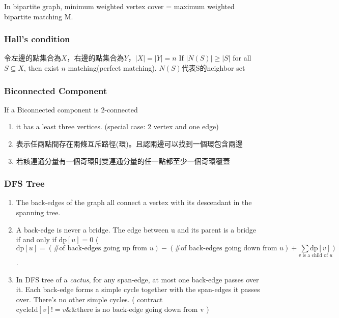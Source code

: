 In bipartite graph, minimum weighted vertex cover = maximum weighted bipartite matching M.

\subsubsection{Hall's condition}

令左邊的點集合為$X$，右邊的點集合為$Y$，$|X| = |Y| = n$
If $|N(S)| \geq |S|$ for all $S \subseteq X$, then exist $n$ matching(perfect matching).
$N(S)$代表S的neighbor set


\subsubsection{Biconnected Component}
If a Biconnected component is 2-connected
\begin{enumerate}
	\setlength\itemsep{-0.5em}
	\item it has a least three vertices. (special case: 2 vertex and one edge)
	\item 表示任兩點間存在兩條互斥路徑(環)。且認兩邊可以找到一個環包含兩邊
	\item 若該連通分量有一個奇環則雙連通分量的任一點都至少一個奇環覆蓋
\end{enumerate}
\subsubsection{DFS Tree}
\begin{enumerate}
	\setlength\itemsep{-0.5em}
	\item The back-edges of the graph all connect a vertex with its descendant in the spanning tree.
	\item A back-edge is never a bridge. The edge between u and its parent is a bridge if and only if $\mathrm{dp}[u] = 0$ ( $\mathrm{dp}[u] = (\text{\# of back-edges going up from } u) - (\text{\# of back-edges going down from } u) + \underset{v \text{ is a child of } u}{\sum \mathrm{dp}[v]} )$.
	\item In DFS tree of a \emph{cactus}, for any span-edge, at most one back-edge passes over it. Each back-edge forms a simple cycle together with the span-edges it passes over. There's no other simple cycles. ( contract $\mathrm{cycleId}[v] != v \&\& \text{there is no back-edge going down from v}$ )
\end{enumerate}

